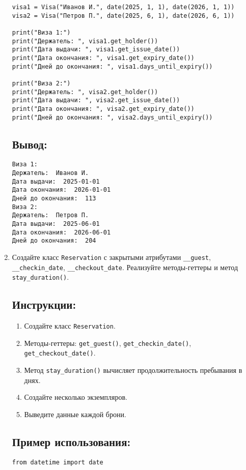 \begin{enumerate}
\begin{lstlisting}[caption=Пример кода]
visa1 = Visa("Иванов И.", date(2025, 1, 1), date(2026, 1, 1))
visa2 = Visa("Петров П.", date(2025, 6, 1), date(2026, 6, 1))

print("Виза 1:")
print("Держатель: ", visa1.get_holder())
print("Дата выдачи: ", visa1.get_issue_date())
print("Дата окончания: ", visa1.get_expiry_date())
print("Дней до окончания: ", visa1.days_until_expiry())

print("Виза 2:")
print("Держатель: ", visa2.get_holder())
print("Дата выдачи: ", visa2.get_issue_date())
print("Дата окончания: ", visa2.get_expiry_date())
print("Дней до окончания: ", visa2.days_until_expiry())
\end{lstlisting}

\subsection*{Вывод:}
\begin{lstlisting}[caption=Ожидаемый вывод]
Виза 1:
Держатель:  Иванов И.
Дата выдачи:  2025-01-01
Дата окончания:  2026-01-01
Дней до окончания:  113
Виза 2:
Держатель:  Петров П.
Дата выдачи:  2025-06-01
Дата окончания:  2026-06-01
Дней до окончания:  204
\end{lstlisting}

\item
Создайте класс \texttt{Reservation} с закрытыми атрибутами \texttt{\_\_guest}, \texttt{\_\_checkin\_date}, \texttt{\_\_checkout\_date}. Реализуйте методы-геттеры и метод \texttt{stay\_duration()}.

\subsection*{Инструкции:}
\begin{enumerate}
    \item Создайте класс \texttt{Reservation}.
    \item Методы-геттеры: \texttt{get\_guest()}, \texttt{get\_checkin\_date()}, \texttt{get\_checkout\_date()}.
    \item Метод \texttt{stay\_duration()} вычисляет продолжительность пребывания в днях.
    \item Создайте несколько экземпляров.
    \item Выведите данные каждой брони.
\end{enumerate}

\subsection*{Пример использования:}
\begin{lstlisting}[caption=Пример кода]
from datetime import date


\end{lstlisting}
\end{enumerate}
